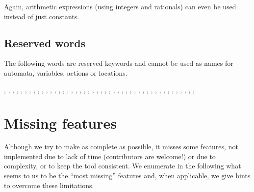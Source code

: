 Again, arithmetic expressions (using integers and rationals) can even be used instead of just constants.



\section{Reserved words}

The following words are reserved keywords and cannot be used as names for automata, variables, actions or locations. 

,
,
,
,
,
,
,
,
,
,
,
,
,
,
,
,
,
,
,
,
,
,
,
,
,
,
,
,
,
,
,
,
,
,
,
,
,
,
,
,
,
,
,
,
,
,






\chapter{Missing features}

Although we try to make \imitator{} as complete as possible, it misses some features, not implemented due to lack of time (contributors are welcome!) or due to complexity, or to keep the tool consistent.
We enumerate in the following what seems to us to be the ``most missing'' features and, when applicable, we give hints to overcome these limitations.


